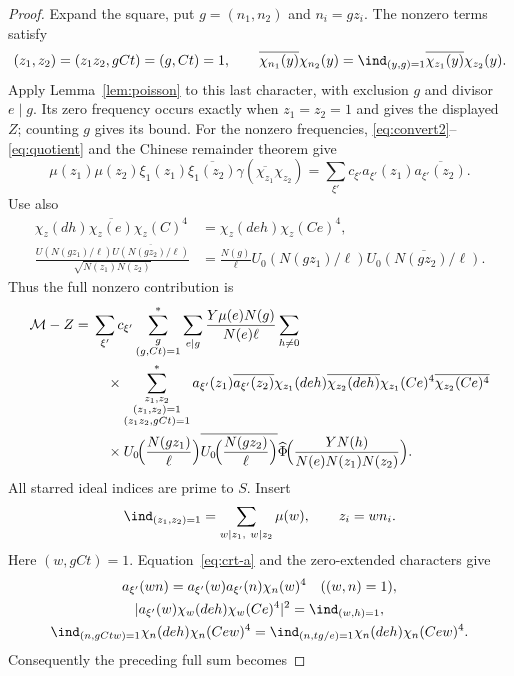 \begin{proof}
Expand the square, put $g=(n_1,n_2)$ and $n_i=gz_i$. The nonzero terms satisfy
\[
 (z_1,z_2)=(z_1z_2,gCt)=(g,Ct)=1,\qquad
 \overline{\chi_{n_1}(y)}\chi_{n_2}(y)
 =\ind_{(y,g)=1}\overline{\chi_{z_1}(y)}\chi_{z_2}(y).
\]
Apply Lemma~\ref{lem:poisson} to this last character, with exclusion
$g$ and divisor $e\mid g$. Its zero frequency occurs exactly when
$z_1=z_2=1$ and gives the displayed $Z$; counting $g$ gives its bound.
For the nonzero frequencies, \eqref{eq:convert2}--\eqref{eq:quotient}
and the Chinese remainder theorem give
\[
 \mu(z_1)\mu(z_2)\xi_1(z_1)\overline{\xi_1(z_2)}
 \gamma(\overline{\chi_{z_1}}\chi_{z_2}) =\sum_{\xi'}c_{\xi'}a_{\xi'}(z_1)\overline{a_{\xi'}(z_2)}.
\]
Use also
\[
 \begin{aligned}
 \chi_z(dh)\overline{\chi_z(e)}\chi_z(C)^4
 &=\chi_z(deh)\chi_z(Ce)^4,\\
 \frac{U(N(gz_1)/\ell)\overline{U(N(gz_2)/\ell)}}
      {\sqrt{N(z_1)N(z_2)}}
 &=\frac{N(g)}\ell U_0(N(gz_1)/\ell)\overline{U_0(N(gz_2)/\ell)}.
 \end{aligned}
\]
Thus the full nonzero contribution is
\[
 \begin{aligned}
 \mathcal M-Z={}&\sum_{\xi'}c_{\xi'}
 \sum_{\substack{g\\(g,Ct)=1}}^*\sum_{e\mid g}
 \frac{Y\mu(e)N(g)}{N(e)\ell}\sum_{h\ne0}\\
 &\quad\times\sum_{\substack{z_1,z_2\\(z_1,z_2)=1\\(z_1z_2,gCt)=1}}^*
 a_{\xi'}(z_1)\overline{a_{\xi'}(z_2)} \chi_{z_1}(deh)\overline{\chi_{z_2}(deh)}
 \chi_{z_1}(Ce)^4\overline{\chi_{z_2}(Ce)^4}\\
 &\quad\times
 U_0\!\Bigl(\frac{N(gz_1)}\ell\Bigr)
 \overline{U_0\!\Bigl(\frac{N(gz_2)}\ell\Bigr)}
 \widehat\Phi\!\Bigl(\frac{YN(h)}{N(e)N(z_1)N(z_2)}\Bigr).
 \end{aligned}
\]
All starred ideal indices are prime to $S$. Insert
\[
 \ind_{(z_1,z_2)=1}=\sum_{w\mid z_1,\ w\mid z_2}\mu(w),
 \qquad z_i=wn_i.
\]
Here $(w,gCt)=1$. Equation~\eqref{eq:crt-a} and the zero-extended characters give
\[
 \begin{gathered}
 a_{\xi'}(wn)=a_{\xi'}(w)a_{\xi'}(n)\chi_n(w)^4
       \quad((w,n)=1),\\
 |a_{\xi'}(w)\chi_w(deh)\chi_w(Ce)^4|^2=\ind_{(w,h)=1},\\
 \ind_{(n,gCtw)=1}\chi_n(deh)\chi_n(Cew)^4
 =\ind_{(n,tg/e)=1}\chi_n(deh)\chi_n(Cew)^4.
 \end{gathered}
\]
Consequently the preceding full sum becomes

\end{proof}

